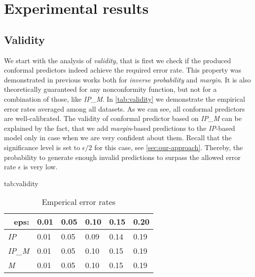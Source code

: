 \section{Experimental results}
\label{sec:experiments}

\subsection{Validity}
\label{sec:experiments:validity}

We start with the analysis of \textit{validity}, that is first we check if 
the produced conformal predictors indeed achieve the required error rate. 
This property was demonstrated in previous works both for \textit{inverse probability} and \textit{margin}.
It is also theoretically guaranteed for any nonconformity function, but not
for a combination of those, like \textit{IP\_M}.
In \cref{tab:validity} we demonstrate the empirical error rates averaged among all datasets. 
As we can see, all conformal predictors are well-calibrated. 
The validity of conformal predictor based on \textit{IP\_M} can be explained 
by the fact, that we add \textit{margin}-based predictions to the 
\textit{IP}-based model only in case when we are very confident about them. 
Recall that the  significance level is set to $\epsilon / 2$ for this case, see
\cref{sec:our-approach}. 
Thereby, the probability to generate enough invalid predictions to surpass 
the allowed error rate $\epsilon$ is very low.

\begin{table}[htbp]
\floatconts
  {tab:validity}%
  {\caption{Emperical error rates}}%
  {
\begin{tabular}{l|lllll}
\multicolumn{1}{r}{\textbf{eps:}}   & \textbf{0.01} & \textbf{0.05} & \textbf{0.10} & \textbf{0.15} & \textbf{0.20} \\
\hline
\textit{IP}    & 0.01          & 0.05          & 0.09         & 0.14          & 0.19         \\
\textit{IP\_M} & 0.01          & 0.05          & 0.10         & 0.15          & 0.19         \\
\textit{M}     & 0.01          & 0.05          & 0.10         & 0.15          & 0.19        
\end{tabular}
  }
\end{table}


